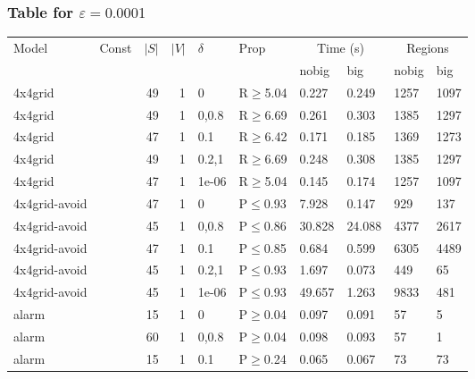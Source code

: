 \subsubsection{Table for \(\varepsilon=0.0001\)}
\begin{longtable}{llrrllllll}

        \toprule
        Model & Const & $|S|$ & $|V|$ & $\delta$ & Prop & \multicolumn{2}{c}{Time (s)} & \multicolumn{2}{c}{Regions} \\
        \cmidrule(ll){7-8} \cmidrule(ll){9-10}
        & & & & & & nobig & big & nobig & big \\
        \midrule
        
 4x4grid       &          &     	49 & 1 & 0     & R$\geq$5.04  & 0.227    & 0.249    & 1257    & 1097    \\
 4x4grid       &          &     	49 & 1 & 0,0.8 & R$\geq$6.69  & 0.261    & 0.303    & 1385    & 1297    \\
 4x4grid       &          &     	47 & 1 & 0.1   & R$\geq$6.42  & 0.171    & 0.185    & 1369    & 1273    \\
 4x4grid       &          &     	49 & 1 & 0.2,1 & R$\geq$6.69  & 0.248    & 0.308    & 1385    & 1297    \\
 4x4grid       &          &     	47 & 1 & 1e-06 & R$\geq$5.04  & 0.145    & 0.174    & 1257    & 1097    \\
 4x4grid-avoid &          &     	47 & 1 & 0     & P$\leq$0.93  & 7.928    & 0.147    & 929     & 137     \\
 4x4grid-avoid &          &     	45 & 1 & 0,0.8 & P$\leq$0.86  & 30.828   & 24.088   & 4377    & 2617    \\
 4x4grid-avoid &          &     	47 & 1 & 0.1   & P$\leq$0.85  & 0.684    & 0.599    & 6305    & 4489    \\
 4x4grid-avoid &          &     	45 & 1 & 0.2,1 & P$\leq$0.93  & 1.697    & 0.073    & 449     & 65      \\
 4x4grid-avoid &          &     	45 & 1 & 1e-06 & P$\leq$0.93  & 49.657   & 1.263    & 9833    & 481     \\
 alarm         &          &     	15 & 1 & 0     & P$\geq$0.04  & 0.097    & 0.091    & 57      & 5       \\
 alarm         &          &     	60 & 1 & 0,0.8 & P$\geq$0.04  & 0.098    & 0.093    & 57      & 1       \\
 alarm         &          &     	15 & 1 & 0.1   & P$\geq$0.24  & 0.065    & 0.067    & 73      & 73      \\

\end{longtable}
